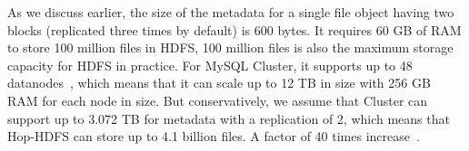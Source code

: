 \noindent As we discuss earlier, the size of the metadata for a single file object having two blocks (replicated three times by default) is 600 bytes. It requires 60 GB of RAM to store 100 million files in HDFS, 100 million files is also the maximum storage capacity for HDFS in practice. For MySQL Cluster, it supports up to 48 datanodes~\cite{mysql48nodes}, which means that it can scale up to 12 TB in size with 256 GB RAM for each node in size. But conservatively, we assume that Cluster can support up to 3.072 TB for metadata with a replication of 2, which means that Hop-HDFS can store up to 4.1 billion files. A factor of 40 times increase~\cite{hakimzadeh2014scaling}. 


